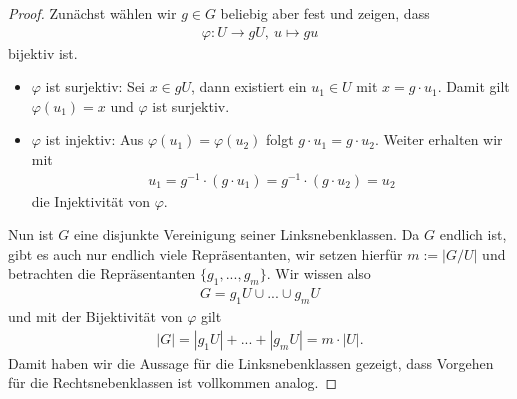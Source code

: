 \begin{proof}
Zunächst wählen wir $g \in G$ beliebig aber fest und zeigen, dass 
\begin{align*}
\varphi : U \to gU, \ u \mapsto gu
\end{align*}
bijektiv ist.
\begin{itemize}
\item $\varphi$ ist surjektiv: Sei $x \in gU$, dann existiert ein $u_1 \in U$ mit $x = g \cdot u_1$.
Damit gilt $\varphi(u_1) = x$ und $\varphi$ ist surjektiv.
\item $\varphi$ ist injektiv: Aus $\varphi(u_1) = \varphi(u_2)$ folgt $g \cdot u_1 = g \cdot u_2 $.
Weiter erhalten wir mit 
\begin{align*}
u_1 = g^{-1} \cdot (g \cdot u_1) = g^{-1} \cdot (g \cdot u_2) = u_2
\end{align*}
die Injektivität von $\varphi$.
\end{itemize}
Nun ist $G$ eine disjunkte Vereinigung seiner Linksnebenklassen.
Da $G$ endlich ist, gibt es auch nur endlich viele Repräsentanten, wir setzen hierfür $m := | G / U |$ und 
betrachten die Repräsentanten $\lbrace g_1,...,g_m \rbrace$.
Wir wissen also 
\begin{align*}
G = g_1U \cup ... \cup g_mU
\end{align*}
und mit der Bijektivität von $\varphi$ gilt 
\begin{align*}
|G| = |g_1U |+ ... + |g_mU| = m \cdot |U|.
\end{align*}
Damit haben wir die Aussage für die Linksnebenklassen gezeigt, dass Vorgehen für die Rechtsnebenklassen ist vollkommen analog.
\end{proof}

